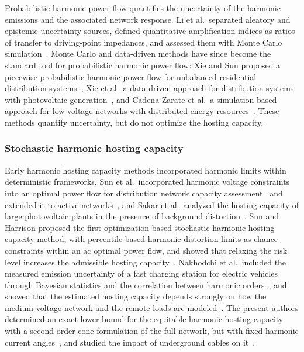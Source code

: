Probabilistic harmonic power flow quantifies the uncertainty of the harmonic emissions and the associated network response. Li et al.\ separated aleatory and epistemic uncertainty sources, defined quantitative amplification indices as ratios of transfer to driving-point impedances, and assessed them with Monte Carlo simulation~\cite{li2020}. Monte Carlo and data-driven methods have since become the standard tool for probabilistic harmonic power flow: Xie and Sun proposed a piecewise probabilistic harmonic power flow for unbalanced residential distribution systems~\cite{xie_piecewise_2022}, Xie et al.\ a data-driven approach for distribution systems with photovoltaic generation~\cite{xie2022}, and Cadena-Zarate et al.\ a simulation-based approach for low-voltage networks with distributed energy resources~\cite{cadenazarate2024}. These methods quantify uncertainty, but do not optimize the hosting capacity.

\subsubsection{Stochastic harmonic hosting capacity}

Early harmonic hosting capacity methods incorporated harmonic limits within deterministic frameworks. Sun et al.\ incorporated harmonic voltage constraints into an optimal power flow for distribution network capacity assessment~\cite{sun_distribution_2012} and extended it to active networks~\cite{sun_incorporating_2012}, and Sakar et al.\ analyzed the hosting capacity of large photovoltaic plants in the presence of background distortion~\cite{sakar_integration_2018}. Sun and Harrison proposed the first optimization-based stochastic harmonic hosting capacity method, with percentile-based harmonic distortion limits as chance constraints within an ac optimal power flow, and showed that relaxing the risk level increases the admissible hosting capacity~\cite{sun_distribution_2022}. Nakhodchi et al.\ included the measured emission uncertainty of a fast charging station for electric vehicles through Bayesian statistics and the correlation between harmonic orders~\cite{nakhodchi2022}, and showed that the estimated hosting capacity depends strongly on how the medium-voltage network and the remote loads are modeled~\cite{nakhodchi_impact_2023}. The present authors determined an exact lower bound for the equitable harmonic hosting capacity with a second-order cone formulation of the full network, but with fixed harmonic current angles~\cite{vanacker_hosting_2026}, and studied the impact of underground cables on it~\cite{vanacker_impact_2025}.

